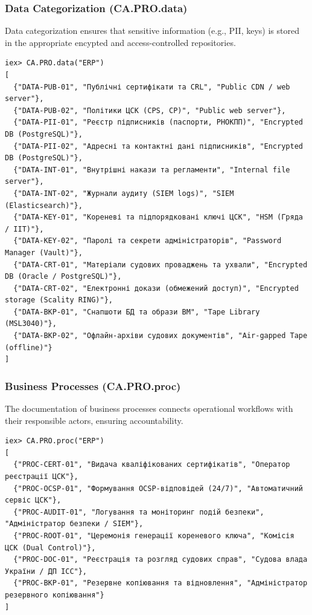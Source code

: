 \documentclass{article}
\begin{document}
\subsubsection{Data Categorization (CA.PRO.data)}
Data categorization ensures that sensitive information (e.g., PII, keys) is stored in the appropriate encypted and access-controlled repositories.
{\scriptsize
{}
\begin{verbatim}
iex> CA.PRO.data("ERP")
[
  {"DATA-PUB-01", "Публічні сертифікати та CRL", "Public CDN / web server"},
  {"DATA-PUB-02", "Політики ЦСК (CPS, CP)", "Public web server"},
  {"DATA-PII-01", "Реєстр підписників (паспорти, РНОКПП)", "Encrypted DB (PostgreSQL)"},
  {"DATA-PII-02", "Адресні та контактні дані підписників", "Encrypted DB (PostgreSQL)"},
  {"DATA-INT-01", "Внутрішні накази та регламенти", "Internal file server"},
  {"DATA-INT-02", "Журнали аудиту (SIEM logs)", "SIEM (Elasticsearch)"},
  {"DATA-KEY-01", "Кореневі та підпорядковані ключі ЦСК", "HSM (Гряда / IIT)"},
  {"DATA-KEY-02", "Паролі та секрети адміністраторів", "Password Manager (Vault)"},
  {"DATA-CRT-01", "Матеріали судових проваджень та ухвали", "Encrypted DB (Oracle / PostgreSQL)"},
  {"DATA-CRT-02", "Електронні докази (обмежений доступ)", "Encrypted storage (Scality RING)"},
  {"DATA-BKP-01", "Снапшоти БД та образи ВМ", "Tape Library (MSL3040)"},
  {"DATA-BKP-02", "Офлайн-архіви судових документів", "Air-gapped Tape (offline)"}
]
\end{verbatim}
}

\subsubsection{Business Processes (CA.PRO.proc)}
The documentation of business processes connects operational workflows with their responsible actors, ensuring accountability.
{\scriptsize
{}
\begin{verbatim}
iex> CA.PRO.proc("ERP")
[
  {"PROC-CERT-01", "Видача кваліфікованих сертифікатів", "Оператор реєстрації ЦСК"},
  {"PROC-OCSP-01", "Формування OCSP-відповідей (24/7)", "Автоматичний сервіс ЦСК"},
  {"PROC-AUDIT-01", "Логування та моніторинг подій безпеки", "Адміністратор безпеки / SIEM"},
  {"PROC-ROOT-01", "Церемонія генерації кореневого ключа", "Комісія ЦСК (Dual Control)"},
  {"PROC-DOC-01", "Реєстрація та розгляд судових справ", "Судова влада України / ДП ІСС"},
  {"PROC-BKP-01", "Резервне копіювання та відновлення", "Адміністратор резервного копіювання"}
]
\end{verbatim}
}
\end{document}
